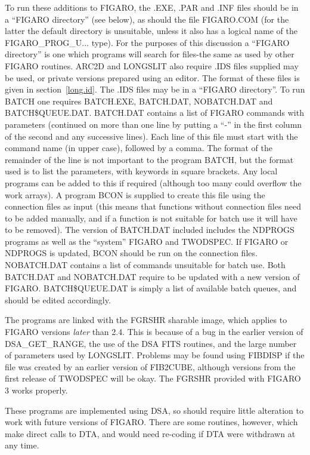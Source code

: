 To run these additions to FIGARO, the .EXE, .PAR and .INF files should
be in a ``FIGARO directory'' (see below), as should the file FIGARO.COM
(for the latter the default directory is unsuitable, unless it also has
a logical name of the FIGARO\_PROG\_U... type).
For the purposes of this discussion a ``FIGARO directory'' is one which
programs will search for files-the same as used by other FIGARO
routines.
ARC2D and LONGSLIT also require .IDS files supplied may be used, or
private versions prepared using an editor.
The format of these files is given in section~\ref{long.id}.
The .IDS files may be in a ``FIGARO directory''.
To run BATCH one requires BATCH.EXE, BATCH.DAT, NOBATCH.DAT and
BATCH\$QUEUE.DAT. BATCH.DAT contains a list of FIGARO commands with
parameters (continued on more than one line by putting a ``-'' in the
first column of the second and any successive lines).
Each line of this file must start with the command name (in upper case),
followed by a comma.
The format of the remainder of the line is not important to the program
BATCH, but the format used is to list the parameters, with keywords in
square brackets.
Any local programs can be added to this if required (although too many
could overflow the work arrays).
A program BCON is supplied to create this file using the connection
files as input (this means that functions without connection files need
to be added manually, and if a function is not suitable for batch use it
will have to be removed).
The version of BATCH.DAT included includes the NDPROGS programs as well
as the ``system'' FIGARO and TWODSPEC.
If FIGARO or NDPROGS is updated, BCON should be run on the connection
files.
NOBATCH.DAT contains a list of commands unsuitable for batch use.
Both BATCH.DAT and NOBATCH.DAT require to be updated with a new version
of FIGARO.
BATCH\$QUEUE.DAT is simply a list of available batch queues, and should
be edited accordingly.

The programs are linked with the FGRSHR sharable image, which applies
to FIGARO versions {\em later} than 2.4. This is because of a bug in
the earlier version of DSA\_GET\_RANGE, the use of the DSA FITS
routines, and the large number of parameters used by LONGSLIT.
Problems may be found using FIBDISP if the file was created by an
earlier version of FIB2CUBE, although versions from the first release of
TWODSPEC will be okay.
The FGRSHR provided with FIGARO 3 works properly.

These programs are implemented using DSA, so should require little
alteration to work with future versions of FIGARO. There are some
routines, however, which make direct calls to DTA, and would need
re-coding if DTA were withdrawn at any time.

